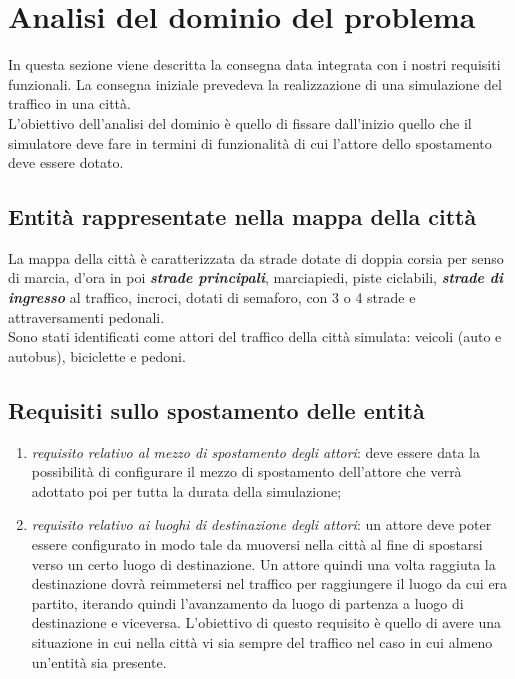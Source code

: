 \section{Analisi del dominio del problema}
In questa sezione viene descritta la consegna data integrata con i nostri requisiti funzionali. La consegna iniziale prevedeva la realizzazione di una simulazione del traffico in una città. \\
L'obiettivo dell'analisi del dominio è quello di fissare dall'inizio quello che il simulatore deve fare in termini di funzionalità di cui l'attore dello spostamento deve essere dotato.

\subsection{Entità rappresentate nella mappa della città}
\label{firstmappa}
La mappa della città è caratterizzata da strade dotate di doppia corsia per senso di marcia, d'ora in poi \textit{\textbf{strade principali}}, marciapiedi, piste ciclabili, \textit{\textbf{strade di ingresso}} al traffico, incroci, dotati di semaforo, con 3 o 4 strade e attraversamenti pedonali.\\
Sono stati identificati come attori del traffico della città simulata: veicoli (auto e autobus), biciclette e pedoni.

\subsection{Requisiti sullo spostamento delle entità}
\begin{enumerate}
\item {\textit{requisito relativo al mezzo di spostamento degli attori}}: deve essere data la possibilità di configurare il mezzo di spostamento dell'attore che verrà adottato poi per tutta la durata della simulazione;
\item {\textit{requisito relativo ai luoghi di destinazione degli attori}}: un attore deve poter essere configurato in modo tale da muoversi nella città al fine di spostarsi verso un certo luogo di destinazione.
Un attore quindi una volta raggiuta la destinazione dovrà reimmetersi nel traffico per raggiungere il luogo da cui era partito, iterando quindi l'avanzamento da luogo di partenza a luogo di destinazione e viceversa. L'obiettivo di questo requisito è quello di avere una situazione in cui nella città vi sia sempre del traffico nel caso in cui almeno un'entità sia presente.
\end{enumerate}

